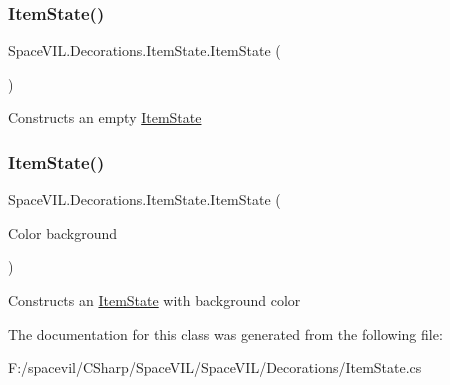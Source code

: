 \subsubsection{\texorpdfstring{Item\+State()}{ItemState()}\hspace{0.1cm}{\footnotesize\ttfamily [1/2]}}
{\footnotesize\ttfamily Space\+V\+I\+L.\+Decorations.\+Item\+State.\+Item\+State (\begin{DoxyParamCaption}{ }\end{DoxyParamCaption})}



Constructs an empty \mbox{\hyperlink{class_space_v_i_l_1_1_decorations_1_1_item_state}{Item\+State}} 

\mbox{\label{class_space_v_i_l_1_1_decorations_1_1_item_state_a9fc55f09c2eca01e8e465502683d8a1c}} 
\subsubsection{\texorpdfstring{Item\+State()}{ItemState()}\hspace{0.1cm}{\footnotesize\ttfamily [2/2]}}
{\footnotesize\ttfamily Space\+V\+I\+L.\+Decorations.\+Item\+State.\+Item\+State (\begin{DoxyParamCaption}\item[{Color}]{background }\end{DoxyParamCaption})}



Constructs an \mbox{\hyperlink{class_space_v_i_l_1_1_decorations_1_1_item_state}{Item\+State}} with background color 



The documentation for this class was generated from the following file\+:\begin{DoxyCompactItemize}
\item 
F\+:/spacevil/\+C\+Sharp/\+Space\+V\+I\+L/\+Space\+V\+I\+L/\+Decorations/Item\+State.\+cs\end{DoxyCompactItemize}
